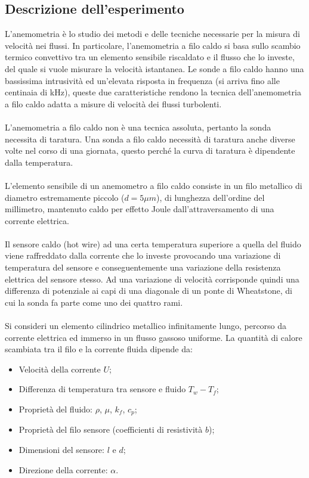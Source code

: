 \subsection{Descrizione dell'esperimento}
L'anemometria è lo studio dei metodi e delle tecniche necessarie per la misura di velocità nei flussi. In particolare, l'anemometria a filo caldo si basa sullo scambio termico convettivo tra un elemento sensibile riscaldato e il flusso che lo investe, del quale si vuole misurare la velocità istantanea. Le sonde a filo caldo hanno una bassissima intrusività ed un'elevata risposta in frequenza (si arriva fino alle centinaia di kHz), queste due caratteristiche rendono la tecnica dell'anemometria a filo caldo adatta a misure di velocità dei flussi turbolenti.\\\\
L'anemometria a filo caldo non è una tecnica assoluta, pertanto la sonda necessita di taratura. Una sonda a filo caldo necessità di taratura anche diverse volte nel corso di una giornata, questo perché la curva di taratura è dipendente dalla temperatura.\\\\
L'elemento sensibile di un anemometro a filo caldo consiste in un filo metallico di diametro estremamente piccolo ($d=5\mu m$), di lunghezza dell'ordine del millimetro, mantenuto caldo per effetto Joule dall'attraversamento di una corrente elettrica.\\\\
Il sensore caldo (hot wire) ad una certa temperatura superiore a quella del fluido viene raffreddato dalla corrente che lo investe provocando una variazione di temperatura del sensore e conseguentemente una variazione della resistenza elettrica del sensore stesso. Ad una variazione di velocità corrisponde quindi una differenza di potenziale ai capi di una diagonale di un ponte di Wheatstone, di cui la sonda fa parte come uno dei quattro rami.\\\\
Si consideri un elemento cilindrico metallico infinitamente lungo, percorso da corrente elettrica ed immerso in un flusso gassoso uniforme. La quantità di calore scambiata tra il filo e la corrente fluida dipende da:
\begin{itemize}
    \item Velocità della corrente $U$;
    \item Differenza di temperatura tra sensore e fluido $T_w-T_f$;
    \item Proprietà del fluido: $\rho$, $\mu$, $k_f$, $c_p$;
    \item Proprietà del filo sensore (coefficienti di resistività $b$);
    \item Dimensioni del sensore: $l$ e $d$;
    \item Direzione della corrente: $\alpha$.
\end{itemize}
